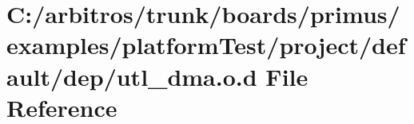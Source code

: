 \hypertarget{platform_test_2project_2default_2dep_2utl__dma_8o_8d}{\section{C\-:/arbitros/trunk/boards/primus/examples/platform\-Test/project/default/dep/utl\-\_\-dma.o.\-d File Reference}
\label{platform_test_2project_2default_2dep_2utl__dma_8o_8d}
}
